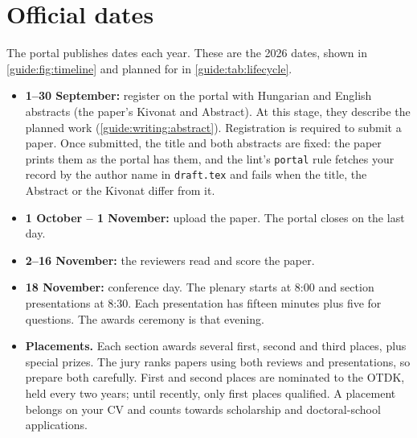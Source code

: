 \section{Official dates}\label{guide:tdk:dates}
The portal publishes dates each year. These are the 2026 dates, shown in \cref{guide:fig:timeline} and planned for in \cref{guide:tab:lifecycle}.
\begin{itemize}
  \item \textbf{1--30 September:} register on the portal with Hungarian and English abstracts (the paper's Kivonat and Abstract). At this stage, they describe the planned work (\cref{guide:writing:abstract}). Registration is required to submit a paper. Once submitted, the title and both abstracts are fixed: the paper prints them as the portal has them, and the lint's \texttt{portal} rule fetches your record by the author name in \texttt{draft.tex} and fails when the title, the Abstract or the Kivonat differ from it.
  \item \textbf{1 October -- 1 November:} upload the paper. The portal closes on the last day.
  \item \textbf{2--16 November:} the reviewers read and score the paper.
  \item \textbf{18 November:} conference day. The plenary starts at 8:00 and section presentations at 8:30. Each presentation has fifteen minutes plus five for questions. The awards ceremony is that evening.
  \item \textbf{Placements.} Each section awards several first, second and third places, plus special prizes. The jury ranks papers using both reviews and presentations, so prepare both carefully. First and second places are nominated to the OTDK, held every two years; until recently, only first places qualified. A placement belongs on your CV and counts towards scholarship and doctoral-school applications.
\end{itemize}



